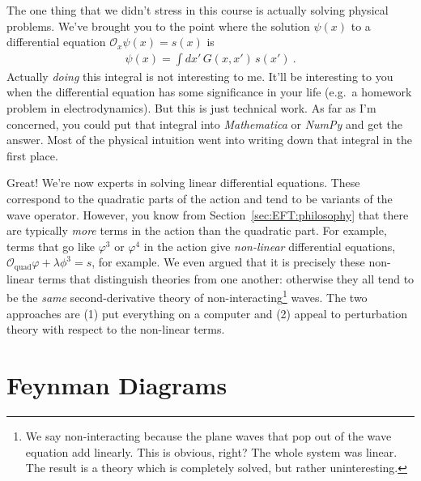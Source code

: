 The one thing that we didn't stress in this course is actually solving physical problems. We've brought you to the point where the solution $\psi(x)$ to a differential equation $\mathcal O_x \psi(x) = s(x)$ is
\begin{align}
	\psi(x) = \int dx'\, G(x,x')\, s(x') \ .
\end{align}
Actually \emph{doing} this integral is not interesting to me. It'll be interesting to you when the differential equation has some significance in your life (e.g.~a homework problem in electrodynamics). But this is just technical work. As far as I'm concerned, you could put that integral into \emph{Mathematica} or \emph{NumPy} and get the answer. Most of the physical intuition went into writing down that integral in the first place.

Great! We're now experts in solving linear differential equations. These correspond to the quadratic parts of the action and tend to be variants of the wave operator. However, you know from Section~\ref{sec:EFT:philosophy} that there are typically \emph{more} terms in the action than the quadratic part. For example, terms that go like $\varphi^3$ or $\varphi^4$ in the action give \emph{non-linear} differential equations, $\mathcal O_\text{quad}\varphi + \lambda \phi^3 = s$, for example. We even argued that it is precisely these non-linear terms that distinguish theories from one another: otherwise they all tend to be the \emph{same} second-derivative theory of non-interacting\footnote{We say non-interacting because the plane waves that pop out of the wave equation add linearly. This is obvious, right? The whole system was linear. The result is a theory which is completely solved, but rather uninteresting.} waves. The two approaches are (1) put everything on a computer and (2) appeal to perturbation theory with respect to the non-linear terms.
 

\chapter{Feynman Diagrams}

